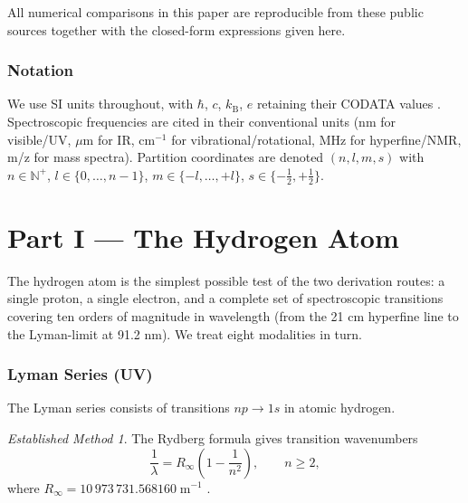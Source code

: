 \documentclass[twocolumn,11pt,a4paper]{article}
\theoremstyle{stmtstyle}
\theoremstyle{definition}
\theoremstyle{remark}
\newtheorem*{established}{Established Method}
\newcommand{\kB}{k_{\mathrm{B}}}
\newcommand{\Natural}{\mathbb{N}}
\begin{document}
All numerical comparisons in this paper are reproducible from these public sources together with the closed-form expressions given here.

\section{Notation}
\label{sec:notation}

We use SI units throughout, with $\hbar$, $c$, $\kB$, $e$ retaining their CODATA values \citep{codata2022}. Spectroscopic frequencies are cited in their conventional units (nm for visible/UV, $\mu$m for IR, cm$^{-1}$ for vibrational/rotational, MHz for hyperfine/NMR, m/z for mass spectra). Partition coordinates are denoted $(n,l,m,s)$ with $n\in\Natural^{+}$, $l\in\{0,\ldots,n-1\}$, $m\in\{-l,\ldots,+l\}$, $s\in\{-\tfrac{1}{2},+\tfrac{1}{2}\}$.

\clearpage

\part*{Part I --- The Hydrogen Atom}

The hydrogen atom is the simplest possible test of the two derivation routes: a single proton, a single electron, and a complete set of spectroscopic transitions covering ten orders of magnitude in wavelength (from the 21 cm hyperfine line to the Lyman-limit at 91.2 nm). We treat eight modalities in turn.

\section{Lyman Series (UV)}
\label{sec:hlyman}

The Lyman series consists of transitions $np \to 1s$ in atomic hydrogen.

\begin{established}
The Rydberg formula gives transition wavenumbers
\begin{equation}
\frac{1}{\lambda}=R_{\infty}\left(1-\frac{1}{n^{2}}\right),\qquad n\geq 2,
\label{eq:lymanrydberg}
\end{equation}
where $R_{\infty}=10\,973\,731.568160\;\mathrm{m}^{-1}$ \citep{codata2022}.
\end{established}
\end{document}

